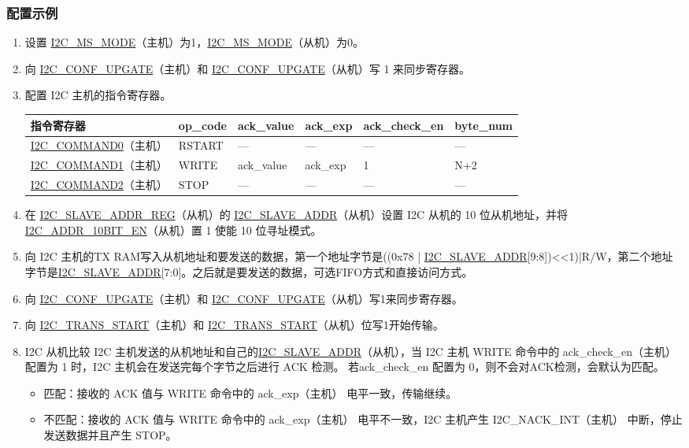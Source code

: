 \documentclass[main\_\_CN.tex]{subfiles}
\begin{document}
\subsubsection{配置示例}
\begin{enumerate}
\item 设置 \hyperref[fielddesc:I2CMSMODE]{I2C\_MS\_MODE}（主机）为1，\hyperref[fielddesc:I2CMSMODE]{I2C\_MS\_MODE}（从机）为0。
\item 向 \hyperref[fielddesc:I2CCONFUPGATE]{I2C\_CONF\_UPGATE}（主机）和 \hyperref[fielddesc:I2CCONFUPGATE]{I2C\_CONF\_UPGATE}（从机）写 1 来同步寄存器。
\item 配置 I2C 主机的指令寄存器。

\begin{longtable}{ | p{4cm} | p{2cm} | p{2cm} | p{2cm} |p{2cm} | p{2cm} |}
\hline\rowcolor{lightgray}
指令寄存器& op\_code & ack\_value&ack\_exp&ack\_check\_en&byte\_num  \\ \hline
\hyperref[fielddesc:I2CCOMMAND0]{I2C\_COMMAND0}（主机）& RSTART& ---&---&---&---  \\ \hline
\hyperref[fielddesc:I2CCOMMAND1]{I2C\_COMMAND1}（主机）& WRITE& ack\_value&ack\_exp&1&N+2  \\ \hline
\hyperref[fielddesc:I2CCOMMAND2]{I2C\_COMMAND2}（主机）& STOP& ---&---&---&---  \\ \hline
\end{longtable}

\item 在 \hyperref[regdesc:I2CSLAVEADDRREG]{I2C\_SLAVE\_ADDR\_REG}（从机）的 \hyperref[fielddesc:I2CSLAVEADDR]{I2C\_SLAVE\_ADDR}（从机）设置 I2C 从机的 10 位从机地址，并将 \hyperref[fielddesc:I2CADDR10BITEN]{I2C\_ADDR\_10BIT\_EN}（从机）置 1 使能 10 位寻址模式。
\item 向 I2C 主机的TX RAM写入从机地址和要发送的数据，第一个地址字节是((0x78 | \hyperref[fielddesc:I2CSLAVEADDR]{I2C\_SLAVE\_ADDR}[9:8])<<1)|R/W，第二个地址字节是\hyperref[fielddesc:I2CSLAVEADDR]{I2C\_SLAVE\_ADDR}[7:0]。之后就是要发送的数据，可选FIFO方式和直接访问方式。
\item 向 \hyperref[fielddesc:I2CCONFUPGATE]{I2C\_CONF\_UPGATE}（主机）和 \hyperref[fielddesc:I2CCONFUPGATE]{I2C\_CONF\_UPGATE}（从机）写1来同步寄存器。
\item 向 \hyperref[fielddesc:I2CTRANSSTART]{I2C\_TRANS\_START}（主机）和 \hyperref[fielddesc:I2CTRANSSTART]{I2C\_TRANS\_START}（从机）位写1开始传输。
\item I2C 从机比较 I2C 主机发送的从机地址和自己的\hyperref[fielddesc:I2CSLAVEADDR]{I2C\_SLAVE\_ADDR}（从机），当 I2C 主机 WRITE 命令中的 ack\_check\_en（主机） 配置为 1 时，I2C 主机会在发送完每个字节之后进行 ACK 检测。 若ack\_check\_en 配置为 0，则不会对ACK检测，会默认为匹配。
\begin{itemize}
\item 匹配：接收的 ACK 值与 WRITE 命令中的 ack\_exp（主机） 电平一致，传输继续。
\item 不匹配：接收的 ACK 值与 WRITE 命令中的 ack\_exp（主机） 电平不一致，I2C 主机产生 I2C\_NACK\_INT（主机） 中断，停止发送数据并且产生 STOP。
\end{itemize}


\end{enumerate}
\end{document}
